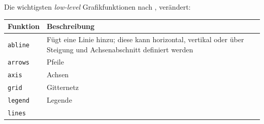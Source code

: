 \documentclass[]{book}
\begin{document}
Die wichtigsten \emph{low-level} Grafikfunktionen nach \citet{Ligges2008}, verändert:

\begin{longtable}[]{@{}ll@{}}
\toprule
\begin{minipage}[b]{0.38\columnwidth}\raggedright
Funktion\strut
\end{minipage} & \begin{minipage}[b]{0.56\columnwidth}\raggedright
Beschreibung\strut
\end{minipage}\tabularnewline
\midrule
\endhead
\begin{minipage}[t]{0.38\columnwidth}\raggedright
\texttt{abline}\strut
\end{minipage} & \begin{minipage}[t]{0.56\columnwidth}\raggedright
Fügt eine Linie hinzu; diese kann horizontal, vertikal oder über Steigung und Achsenabschnitt definiert werden\strut
\end{minipage}\tabularnewline
\begin{minipage}[t]{0.38\columnwidth}\raggedright
\texttt{arrows}\strut
\end{minipage} & \begin{minipage}[t]{0.56\columnwidth}\raggedright
Pfeile\strut
\end{minipage}\tabularnewline
\begin{minipage}[t]{0.38\columnwidth}\raggedright
\texttt{axis}\strut
\end{minipage} & \begin{minipage}[t]{0.56\columnwidth}\raggedright
Achsen\strut
\end{minipage}\tabularnewline
\begin{minipage}[t]{0.38\columnwidth}\raggedright
\texttt{grid}\strut
\end{minipage} & \begin{minipage}[t]{0.56\columnwidth}\raggedright
Gitternetz\strut
\end{minipage}\tabularnewline
\begin{minipage}[t]{0.38\columnwidth}\raggedright
\texttt{legend}\strut
\end{minipage} & \begin{minipage}[t]{0.56\columnwidth}\raggedright
Legende\strut
\end{minipage}\tabularnewline
\begin{minipage}[t]{0.38\columnwidth}\raggedright
\texttt{lines}\strut
\end{minipage} & \begin{minipage}[t]{0.56\columnwidth}\raggedright

\end{minipage}
\end{longtable}
\end{document}
